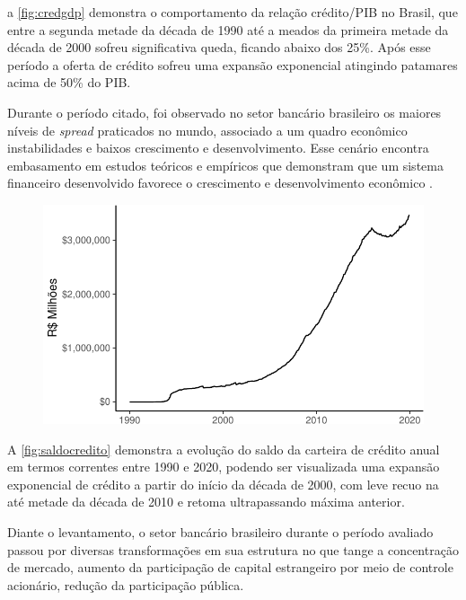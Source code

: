 \documentclass[12pt,openright,oneside,a4paper,chapter=TITLE,section=TITLE,subsection=Title,english,french,spanish,portugues,sumario=tradicional]{04-class-files/abntex2}
\begin{document}
a \autoref{fig:credgdp} demonstra o comportamento da relação crédito/PIB no
Brasil, que entre a segunda metade da década de 1990 até a meados da primeira
metade da década de 2000 sofreu significativa queda, ficando abaixo dos 25\%.
Após esse período a oferta de crédito sofreu uma expansão exponencial atingindo
patamares acima de 50\% do PIB.

Durante o período citado, foi observado no setor bancário brasileiro os maiores
níveis de \emph{spread} praticados no mundo, associado a um quadro econômico
instabilidades e baixos crescimento e desenvolvimento. Esse cenário encontra
embasamento em estudos teóricos e empíricos que demonstram que um sistema
financeiro desenvolvido favorece o crescimento e desenvolvimento econômico
\cite{levine:1997, matos:2003}.

\begin{figure}

\begin{center}\includegraphics{12-exportedfigures/balance credit-1} \end{center}
\label{fig:saldocredito}
\end{figure}

A \autoref{fig:saldocredito} demonstra a evolução do saldo da carteira de
crédito anual em termos correntes entre 1990 e 2020, podendo ser visualizada
uma expansão exponencial de crédito a partir do início da década de 2000, com
leve recuo na até metade da década de 2010 e retoma ultrapassando máxima
anterior.

Diante o levantamento, o setor bancário brasileiro durante o período avaliado
passou por diversas transformações em sua estrutura no que tange a concentração
de mercado, aumento da participação de capital estrangeiro por meio de controle
acionário, redução da participação pública.
\end{document}
